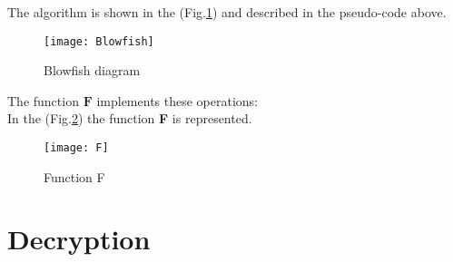 %

The algorithm is shown in the (Fig.\ref{Fig:Blowfish}) and described in the pseudo-code above.\newline
\begin{figure}[!h]
\centering
\texttt{[image: Blowfish]}
\caption{Blowfish diagram}
\label{Fig:Blowfish}
\end{figure}


The function $\mathbf{F}$ implements these operations:\\

\vspace{5mm}
In the (Fig.\ref{Fig:F}) the function \textbf{F} is represented.
\begin{figure}[!h]
\centering
\texttt{[image: F]}
\caption{Function F}
\label{Fig:F}
\end{figure}

\clearpage
\section{Decryption}


